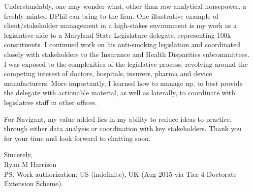 \documentclass{../res}
\begin{document}
\begin{sloppypar}
\begin{resume}
Understandably, one may wonder what, other than raw analytical horsepower, a freshly minted DPhil can bring to the firm. One illustrative example of client/stakeholder management in a high-stakes environment is my work as a legislative aide to a Maryland State Legislature delegate, representing 100k constituents. I continued work on his anti-smoking legislation and coordinated closely with stakeholders to the Insurance and Health Disparities subcommittees. I was exposed to the complexities of the legislative process, revolving around the competing interest of doctors, hospitals, insurers, pharma and device manufacturers. More importantly, I learned how to manage up, to best provide the delegate with actionable material, as well as laterally, to coordinate with legislative staff in other offices.

For Navigant, my value added lies in my ability to reduce ideas to practice, through either data analysis or coordination with key stakeholders. Thank you for your time and look forward to chatting soon.

Sincerely, \\
Ryan M Harrison \\
PS. Work authorization: US (indefinite), UK (Aug-2015 via Tier 4 Doctorate Extension Scheme). 


\end{resume} 
\end{sloppypar}
\end{document}
